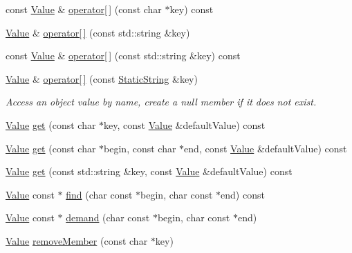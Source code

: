 \begin{DoxyCompactItemize}
\item 
const \hyperlink{class_json_1_1_value}{Value} \& \hyperlink{class_json_1_1_value_a1b0498b7b2a520a68137f682d91abdd5}{operator\mbox{[}$\,$\mbox{]}} (const char $\ast$key) const
\item 
\hyperlink{class_json_1_1_value}{Value} \& \hyperlink{class_json_1_1_value_ae511c7d46bf457412fb55c9471af9f50}{operator\mbox{[}$\,$\mbox{]}} (const std\+::string \&key)
\item 
const \hyperlink{class_json_1_1_value}{Value} \& \hyperlink{class_json_1_1_value_abff34025850a989a92cf936f4cc99982}{operator\mbox{[}$\,$\mbox{]}} (const std\+::string \&key) const
\item 
\hyperlink{class_json_1_1_value}{Value} \& \hyperlink{class_json_1_1_value_ac3763d7d315ca65dc188e273722f7955}{operator\mbox{[}$\,$\mbox{]}} (const \hyperlink{class_json_1_1_static_string}{Static\+String} \&key)
\begin{DoxyCompactList}\small\item\em Access an object value by name, create a null member if it does not exist. \end{DoxyCompactList}\item 
\hyperlink{class_json_1_1_value}{Value} \hyperlink{class_json_1_1_value_a57de86629ed23246f14014fb6c44fa67}{get} (const char $\ast$key, const \hyperlink{class_json_1_1_value}{Value} \&default\+Value) const
\item 
\hyperlink{class_json_1_1_value}{Value} \hyperlink{class_json_1_1_value_aa59ed050e87e1d58d93671a38687f36c}{get} (const char $\ast$begin, const char $\ast$end, const \hyperlink{class_json_1_1_value}{Value} \&default\+Value) const
\item 
\hyperlink{class_json_1_1_value}{Value} \hyperlink{class_json_1_1_value_af17414293cffc973cee466372d8dc151}{get} (const std\+::string \&key, const \hyperlink{class_json_1_1_value}{Value} \&default\+Value) const
\item 
\hyperlink{class_json_1_1_value}{Value} const  $\ast$ \hyperlink{class_json_1_1_value_afb007b9ce9b2cf9d5f667a07e5e0349f}{find} (char const $\ast$begin, char const $\ast$end) const
\item 
\hyperlink{class_json_1_1_value}{Value} const  $\ast$ \hyperlink{class_json_1_1_value_afeb7ff596a0929d90c5f2f3cffb413ed}{demand} (char const $\ast$begin, char const $\ast$end)
\item 
\hyperlink{class_json_1_1_value}{Value} \hyperlink{class_json_1_1_value_aa52f7873b95d29627d6e83ba96f69aaa}{remove\+Member} (const char $\ast$key)

\end{DoxyCompactItemize}
